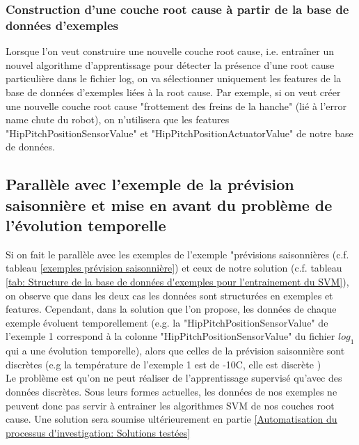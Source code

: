 \subsubsection{Construction d'une couche root cause à partir de la base de données d'exemples}
\label{Automatisation du processus d'investigation: Achitecture High Level du système proposé: Les exemples: Construction d'une couche root cause à partir de la base de données d'exemples}
Lorsque l'on veut construire une nouvelle couche root cause, i.e. entraîner un nouvel algorithme d'apprentissage pour détecter la présence d'une root cause particulière dans le fichier log, on va sélectionner uniquement les features de la base de données d'exemples liées à la root cause. Par exemple, si on veut créer une nouvelle couche root cause "frottement des freins de la hanche" (lié à l'error name chute du robot), on n'utilisera que les features "HipPitchPositionSensorValue" et "HipPitchPositionActuatorValue" de notre base de données.

\subsection{Parallèle avec l'exemple de la prévision saisonnière et mise  en avant du problème de l'évolution temporelle }
\label{Automatisation du processus d'investigation: Achitecture High Level du système proposé: Les exemples: Parallèle avec l'exemple de la prévision saisonnière}
Si on fait le parallèle avec les exemples de l'exemple "prévisions saisonnières (c.f. tableau \ref{exemples prévision saisonnière}) et ceux de notre solution (c.f. tableau \ref {tab: Structure de la base de données d'exemples pour l'entrainement du SVM}), on observe que dans les deux cas les données sont structurées en exemples et features. Cependant, dans la solution que l'on propose, les données de chaque exemple évoluent temporellement (e.g. la "HipPitchPositionSensorValue" de l'exemple 1 correspond à la colonne "HipPitchPositionSensorValue" du fichier $log_1$ qui a une évolution temporelle), alors que celles de la prévision saisonnière sont discrètes (e.g la température de l'exemple 1 est de -10\degres C, elle est discrète ) \\
Le problème est qu'on ne peut réaliser de l'apprentissage supervisé qu'avec des données discrètes. Sous leurs formes actuelles, les données de nos exemples ne peuvent donc pas servir à entrainer les algorithmes SVM de nos couches root cause. Une solution sera soumise ultérieurement en partie \ref{Automatisation du processus d'investigation: Solutions testées}


